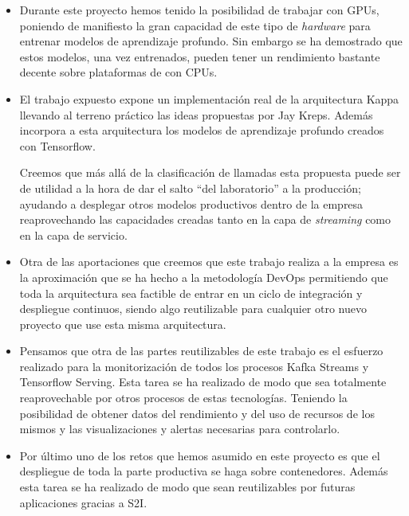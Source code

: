 \begin{itemize}
\item Durante este proyecto hemos tenido la posibilidad de trabajar con GPUs, poniendo de manifiesto la gran capacidad de este tipo de \textit{hardware} para entrenar modelos de aprendizaje profundo. Sin embargo se ha demostrado que estos modelos, una vez entrenados, pueden tener un rendimiento bastante decente sobre plataformas de con CPUs.



\item El trabajo expuesto expone un implementación real de la arquitectura Kappa llevando al terreno práctico las ideas propuestas por Jay Kreps. Además incorpora a esta arquitectura los modelos de aprendizaje profundo creados con Tensorflow. 

Creemos que más allá de la clasificación de llamadas esta propuesta puede ser de utilidad a la hora de dar el salto ``del laboratorio'' a la producción; ayudando a desplegar otros modelos productivos dentro de la empresa reaprovechando las capacidades creadas tanto en la capa de \textit{streaming} como en la capa de servicio.    

\item Otra de las aportaciones que creemos que este trabajo realiza a la empresa es la aproximación que se ha hecho a la metodología DevOps permitiendo que toda la arquitectura sea factible de entrar en un ciclo de integración y despliegue continuos, siendo algo reutilizable para cualquier otro nuevo proyecto que use esta misma arquitectura. 

\item Pensamos que otra de las partes reutilizables de este trabajo es el esfuerzo realizado para la monitorización de todos los procesos Kafka Streams y Tensorflow Serving. Esta tarea se ha realizado de modo que sea totalmente reaprovechable por otros procesos de estas tecnologías. Teniendo la posibilidad de obtener  datos del rendimiento y del uso de recursos de los mismos y las visualizaciones y alertas necesarias para controlarlo.

\item Por último uno de los retos que hemos asumido en este proyecto es que el despliegue de toda la parte productiva se haga sobre contenedores. Además esta tarea se ha realizado de modo que sean reutilizables por futuras aplicaciones gracias a S2I.
\end{itemize}






 